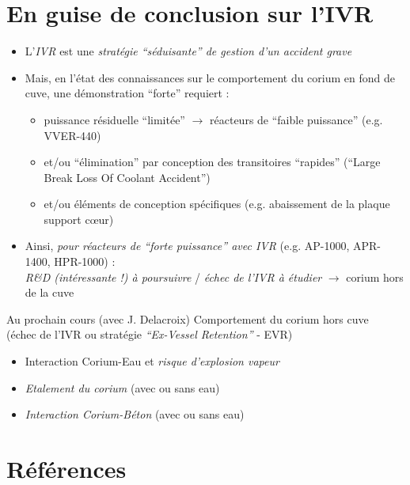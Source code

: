 \documentclass[usenames,dvipsnames]{beamer}
\renewcommand{\emph}[1]{\textcolor{cea8}{\textit{#1}}}
\begin{document}
\section*{En guise de conclusion sur l'IVR}
\begin{frame}[fragile]
\begin{itemize}
\item L'\emph{IVR} est une \emph{stratégie ``séduisante'' de gestion d'un accident grave}
\item Mais, en l'état des connaissances sur le comportement du corium en fond de cuve, une démonstration ``forte'' requiert :
\begin{itemize}
\item puissance résiduelle ``limitée'' $\rightarrow$ réacteurs de ``faible puissance'' (e.g. VVER-440) 
\item et/ou ``élimination'' par conception des transitoires ``rapides'' (``Large Break Loss Of Coolant Accident'')
\item et/ou éléments de conception spécifiques (e.g. abaissement de la plaque support c\oe ur)
\end{itemize}
\item Ainsi, \emph{pour réacteurs de ``forte puissance'' avec IVR} (e.g. AP-1000, APR-1400, HPR-1000) : \\ \emph{R\&D (intéressante !) à poursuivre} / 
\emph{échec de l'IVR à étudier} $\rightarrow$ corium hors de la cuve
\end{itemize}
\begin{ceaexample2block}{Au prochain cours (avec J. Delacroix)}
Comportement du corium hors cuve \\ (échec de l'IVR ou stratégie \emph{``Ex-Vessel Retention''} - EVR)
\begin{itemize}
  \item Interaction Corium-Eau et \emph{risque d'explosion vapeur}
  \item \emph{Etalement du corium} (avec ou sans eau)
  \item \emph{Interaction Corium-Béton} (avec ou sans eau)
\end{itemize}
\end{ceaexample2block}
\end{frame}

\Annexes
\section*{Références}
\begin{frame}
  
\end{frame}
\end{document}
